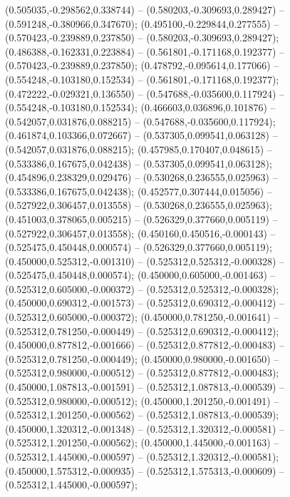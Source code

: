  (0.505035,-0.298562,0.338744) -- (0.580203,-0.309693,0.289427) -- (0.591248,-0.380966,0.347670);
 (0.495100,-0.229844,0.277555) -- (0.570423,-0.239889,0.237850) -- (0.580203,-0.309693,0.289427);
 (0.486388,-0.162331,0.223884) -- (0.561801,-0.171168,0.192377) -- (0.570423,-0.239889,0.237850);
 (0.478792,-0.095614,0.177066) -- (0.554248,-0.103180,0.152534) -- (0.561801,-0.171168,0.192377);
 (0.472222,-0.029321,0.136550) -- (0.547688,-0.035600,0.117924) -- (0.554248,-0.103180,0.152534);
 (0.466603,0.036896,0.101876) -- (0.542057,0.031876,0.088215) -- (0.547688,-0.035600,0.117924);
 (0.461874,0.103366,0.072667) -- (0.537305,0.099541,0.063128) -- (0.542057,0.031876,0.088215);
 (0.457985,0.170407,0.048615) -- (0.533386,0.167675,0.042438) -- (0.537305,0.099541,0.063128);
 (0.454896,0.238329,0.029476) -- (0.530268,0.236555,0.025963) -- (0.533386,0.167675,0.042438);
 (0.452577,0.307444,0.015056) -- (0.527922,0.306457,0.013558) -- (0.530268,0.236555,0.025963);
 (0.451003,0.378065,0.005215) -- (0.526329,0.377660,0.005119) -- (0.527922,0.306457,0.013558);
 (0.450160,0.450516,-0.000143) -- (0.525475,0.450448,0.000574) -- (0.526329,0.377660,0.005119);
 (0.450000,0.525312,-0.001310) -- (0.525312,0.525312,-0.000328) -- (0.525475,0.450448,0.000574);
 (0.450000,0.605000,-0.001463) -- (0.525312,0.605000,-0.000372) -- (0.525312,0.525312,-0.000328);
 (0.450000,0.690312,-0.001573) -- (0.525312,0.690312,-0.000412) -- (0.525312,0.605000,-0.000372);
 (0.450000,0.781250,-0.001641) -- (0.525312,0.781250,-0.000449) -- (0.525312,0.690312,-0.000412);
 (0.450000,0.877812,-0.001666) -- (0.525312,0.877812,-0.000483) -- (0.525312,0.781250,-0.000449);
 (0.450000,0.980000,-0.001650) -- (0.525312,0.980000,-0.000512) -- (0.525312,0.877812,-0.000483);
 (0.450000,1.087813,-0.001591) -- (0.525312,1.087813,-0.000539) -- (0.525312,0.980000,-0.000512);
 (0.450000,1.201250,-0.001491) -- (0.525312,1.201250,-0.000562) -- (0.525312,1.087813,-0.000539);
 (0.450000,1.320312,-0.001348) -- (0.525312,1.320312,-0.000581) -- (0.525312,1.201250,-0.000562);
 (0.450000,1.445000,-0.001163) -- (0.525312,1.445000,-0.000597) -- (0.525312,1.320312,-0.000581);
 (0.450000,1.575312,-0.000935) -- (0.525312,1.575313,-0.000609) -- (0.525312,1.445000,-0.000597);
